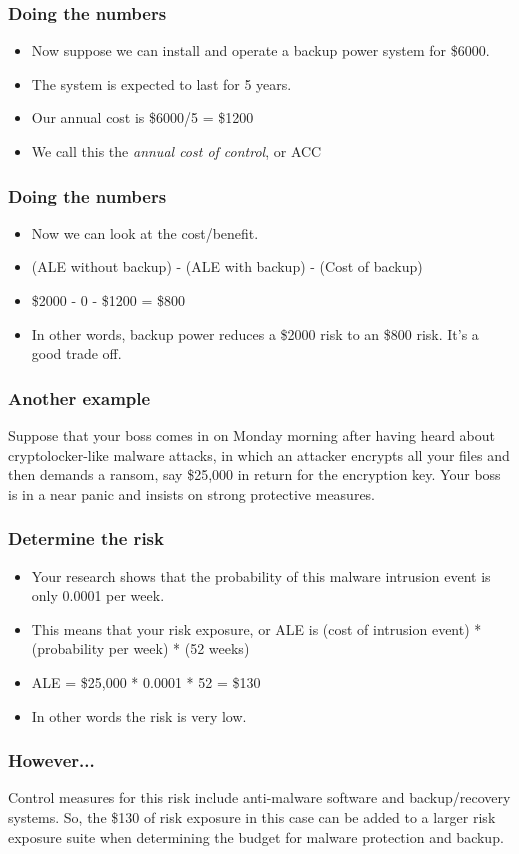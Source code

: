\documentclass[10pt]{beamer}
\begin{document}
\begin{frame}
	\frametitle{Doing the numbers}

	\begin{itemize}
		\item Now suppose we can install and operate
			a backup power system for \$6000.
		\item The system is expected to last for 5 years.
		\item Our annual cost is \$6000/5 = \$1200
		\item We call this the \emph{annual cost of control}, or ACC
	\end{itemize}
\end{frame}

\begin{frame}
	\frametitle{Doing the numbers}

	\begin{itemize}
		\item Now we can look at the cost/benefit.
		\item (ALE without backup) - (ALE with backup) - (Cost of backup)
		\item \$2000 - 0 - \$1200 = \$800
                \item In other words, backup power reduces a \$2000 risk to 
			an \$800 risk. It's a good trade off.
	\end{itemize}
\end{frame}
\begin{frame}
	\frametitle{Another example}

	Suppose that your boss comes in on Monday morning after having heard 
	about cryptolocker-like malware attacks, in which an attacker encrypts
	all your files and then demands a ransom, say \$25,000 in return for the
	encryption key.  Your boss is in a near panic and insists on strong
	protective measures.
\end{frame}
\begin{frame}
	\frametitle{Determine the risk}

	\begin{itemize}
		\item Your research shows that the probability of 
			this malware intrusion event is only 
			0.0001 per week.
		\item This means that your risk exposure, or ALE is
			(cost of intrusion event) * (probability per week) * (52 weeks)
		\item ALE = \$25,000 * 0.0001 * 52 = \$130
		\item In other words the risk is very low.
	\end{itemize}
\end{frame}

\begin{frame}
	\frametitle{However...}

	Control measures for this risk include anti-malware software and
	backup/recovery systems.  So, the \$130 of risk exposure in this case
	can be added to a larger risk exposure suite when determining the budget 
	for malware protection and backup.
\end{frame}
\end{document}
